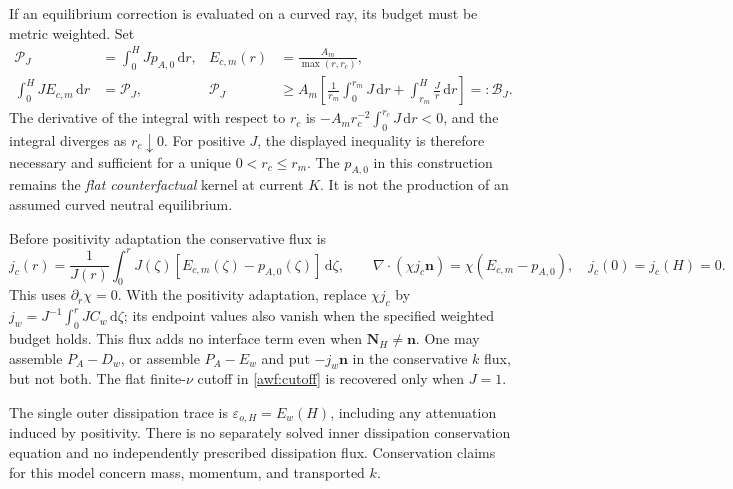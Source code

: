 \documentclass[11pt,a4paper]{article}
\numberwithin{equation}{section}
\newcommand{\eps}{\varepsilon}
\newcommand{\dd}{\mathrm d}
\begin{document}
If an equilibrium correction is evaluated on a curved ray, its
budget must be metric weighted.  Set
\begin{align}
 \mathcal P_J&=\int_0^HJp_{A,0}\,\dd r,
 &E_{c,m}(r)&=\frac{A_m}{\max(r,r_c)},\nonumber\\
 \int_0^HJE_{c,m}\,\dd r&=\mathcal P_J,
 &\mathcal P_J&\geq
 A_m\left[\frac1{r_m}\int_0^{r_m}J\,\dd r
                    +\int_{r_m}^H\frac Jr\,\dd r\right]
 =:\mathcal B_J .
 \label{geo:metric-cutoff}
\end{align}
The derivative of the integral with respect to $r_c$ is
$-A_mr_c^{-2}\int_0^{r_c}J\,\dd r<0$, and the integral diverges
as $r_c\downarrow0$.  For positive $J$, the displayed inequality
is therefore necessary and sufficient for a unique
$0<r_c\leq r_m$.  The $p_{A,0}$ in this construction remains the
\emph{flat counterfactual} kernel at current $K$.  It is not the
production of an assumed curved neutral equilibrium.

Before positivity adaptation the conservative flux is
\begin{equation}
 j_c(r)=\frac1{J(r)}\int_0^rJ(\zeta)
 [E_{c,m}(\zeta)-p_{A,0}(\zeta)]\,\dd\zeta,
 \qquad
 \nabla\cdot(\chi j_c\boldsymbol n)
       =\chi(E_{c,m}-p_{A,0}),\quad
 j_c(0)=j_c(H)=0 .
 \label{geo:metric-redistribution}
\end{equation}
This uses $\partial_r\chi=0$.  With the positivity adaptation,
replace $\chi j_c$ by
$j_w=J^{-1}\int_0^rJC_w\,\dd\zeta$; its endpoint values also
vanish when the specified weighted budget holds.  This flux adds
no interface term even when $\boldsymbol N_H\ne\boldsymbol n$.
One may assemble $P_A-D_w$, or assemble $P_A-E_w$ and put
$-j_w\boldsymbol n$ in the conservative $k$ flux, but not both.
The flat finite-$\nu$ cutoff in \cref{awf:cutoff} is recovered only
when $J=1$.

The single outer dissipation trace is $\eps_{o,H}=E_w(H)$, including
any attenuation induced by positivity.  There is no separately
solved inner dissipation conservation equation and no independently
prescribed dissipation flux.  Conservation claims for this model
concern mass, momentum, and transported $k$.
\end{document}
